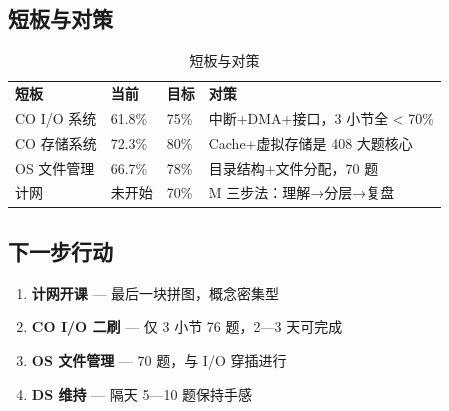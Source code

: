 \documentclass[12pt,a4paper]{ctexart}
\begin{document}
\subsection{短板与对策}

\begin{table}[H]
\footnotesize
\centering
\begin{tabular}{llll}
\hline
\rowcolor{headerbg}\textcolor{headerfg}{\textbf{短板}} & \textcolor{headerfg}{\textbf{当前}} & \textcolor{headerfg}{\textbf{目标}} & \textcolor{headerfg}{\textbf{对策}} \\
CO I/O 系统 & 61.8\% & 75\% & 中断+DMA+接口，3 小节全 < 70\% \\
CO 存储系统 & 72.3\% & 80\% & Cache+虚拟存储是 408 大题核心 \\
OS 文件管理 & 66.7\% & 78\% & 目录结构+文件分配，70 题 \\
计网 & 未开始 & 70\% & M 三步法：理解→分层→复盘 \\
\hline
\end{tabular}
\caption{短板与对策}
\end{table}

\subsection{下一步行动}

\begin{enumerate}
\item \textbf{计网开课} — 最后一块拼图，概念密集型
\item \textbf{CO I/O 二刷} — 仅 3 小节 76 题，2—3 天可完成
\item \textbf{OS 文件管理} — 70 题，与 I/O 穿插进行
\item \textbf{DS 维持} — 隔天 5—10 题保持手感
\end{enumerate}
\end{document}
